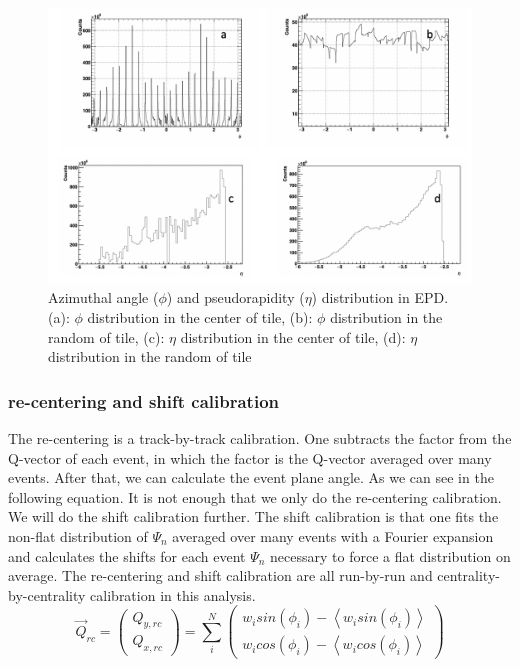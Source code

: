 \begin{figure}[hp]
\includegraphics[scale=0.6]{chapter2/fig/epd_phi_eta.png}
\caption{Azimuthal angle ($\phi$) and pseudorapidity ($\eta$) distribution in EPD. (a): $\phi$ distribution in the center of tile, (b): $\phi$ distribution in the random of tile, (c): $\eta$ distribution in the center of tile, (d): $\eta$ distribution in the random of tile}
\label{fig:epd_phi_eta_dis}
\end{figure}

\subsubsection{re-centering and shift calibration}
The re-centering is a track-by-track calibration. One subtracts the factor from the Q-vector of each event, in which the factor is the Q-vector averaged over many events. After that, we can calculate the event plane angle. As we can see in the following equation. It is not enough that we only do the re-centering calibration. We will do the shift calibration further. The shift calibration is that one fits the non-flat distribution of $\Psi_{n}$ averaged over many events with a Fourier expansion and calculates the shifts for each event $\Psi_{n}$ necessary to force a flat distribution on average. The re-centering and shift calibration are all run-by-run and centrality-by-centrality calibration in this analysis.
\begin{equation}
	\vec{Q}_{rc} = 
	\left( \begin{array}{ccc}
	Q_{y, rc} \\
	Q_{x, rc}
	\end{array} \right)
	=
	\sum_{i}^{N} 
	\left( \begin{array}{ccc}
	w_{i}sin(\phi_{i})-\left< w_{i}sin(\phi_{i}) \right> \\
	w_{i}cos(\phi_{i})-\left< w_{i}cos(\phi_{i}) \right>
	\end{array} \right)
	\label{equ:recenter}
\end{equation}

